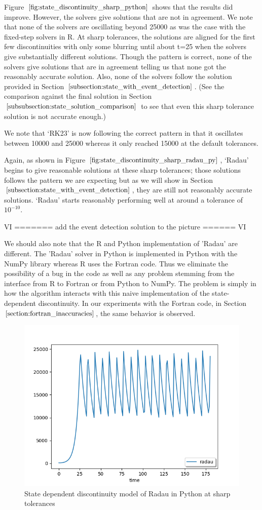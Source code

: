 Figure $\ref{fig:state_discontinuity_sharp_python}$ shows that the results did improve. However, the solvers give solutions that are not in agreement. We note that none of the solvers are oscillating beyond 25000 as was the case with the fixed-step solvers in R. At sharp tolerances, the solutions are aligned for the first few discontinuities with only some blurring until about t=25 when the solvers give substantially different solutions. Though the pattern is correct, none of the solvers give solutions that are in agreement telling us that none got the reasonably accurate solution. Also, none of the solvers follow the solution provided in Section $\ref{subsection:state_with_event_detection}$. (See the comparison against the final solution in Section $\ref{subsubsection:state_solution_comparison}$ to see that even this sharp tolerance solution is not accurate enough.)


We note that `RK23' is now following the correct pattern in that it oscillates between 10000 and 25000 whereas it only reached 15000 at the default tolerances. 

Again, as shown in Figure $\ref{fig:state_discontinuity_sharp_radau_py}$, `Radau' begins to give reasonable solutions at these sharp tolerances; those solutions follows the pattern we are expecting but as we will show in Section $\ref{subsection:state_with_event_detection}$, they are still not reasonably accurate solutions. `Radau' starts reasonably performing well at around a tolerance of $10^{-10}$.

VI =======
add the event detection solution to the picture
====== VI

We should also note that the R and Python implementation of 'Radau' are different. The 'Radau' solver in Python is implemented in Python with the NumPy library whereas R uses the Fortran code. Thus we eliminate the possibility of a bug in the code as well as any problem stemming from the interface from R to Fortran or from Python to NumPy. The problem is simply in how the algorithm interacts with this naive implementation of the state-dependent discontinuity. In our experiments with the Fortran code, in Section $\ref{section:fortran_inaccuracies}$, the same behavior is observed.


\begin{figure}[h]
\centering
\includegraphics[width=0.7\linewidth]{./figures/state_discontinuity_sharp_radau_py}
\caption{State dependent discontinuity model of Radau in Python at sharp tolerances}
\label{fig:state_discontinuity_sharp_radau_py}
\end{figure}

